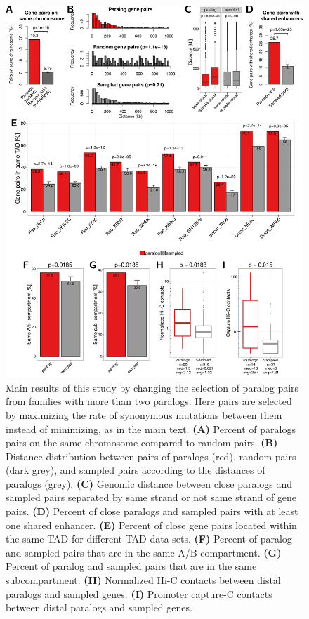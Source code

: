 \documentclass[a4paper,twoside=true,openright,parskip=full,chapterprefix=true,11pt,headings=normal,bibliography=totoc,listof=totoc,titlepage=on,captions=tableabove,draft=false]{scrreprt}
\theoremstyle{definition}
\theoremstyle{definition}
\theoremstyle{definition}
\theoremstyle{remark}
\begin{document}
\begin{figure}

{\centering \includegraphics[width=0.5\linewidth]{figures/paralog/SI/figS2} 

}

\caption{Main results of this study by changing the
selection of paralog pairs from families with more than two paralogs.
Here pairs are selected by maximizing the rate of synonymous mutations
between them instead of minimizing, as in the main text. \textbf{(A)}
Percent of paralogs pairs on the same chromosome compared to random
pairs. \textbf{(B)} Distance distribution between pairs of paralogs
(red), random pairs (dark grey), and sampled pairs according to the
distances of paralogs (grey). \textbf{(C)} Genomic distance between
close paralogs and sampled pairs separated by same strand or not same
strand of gene pairs. \textbf{(D)} Percent of close paralogs and sampled
pairs with at least one shared enhancer. \textbf{(E)} Percent of close
gene pairs located within the same TAD for different TAD data sets.
\textbf{(F)} Percent of paralog and sampled pairs that are in the same
A/B compartment. \textbf{(G)} Percent of paralog and sampled pairs that
are in the same subcompartment. \textbf{(H)} Normalized Hi-C contacts
between distal paralogs and sampled genes. \textbf{(I)} Promoter
capture-C contacts between distal paralogs and sampled genes.}\label{fig:selectOldPairs}
\end{figure}
\end{document}
